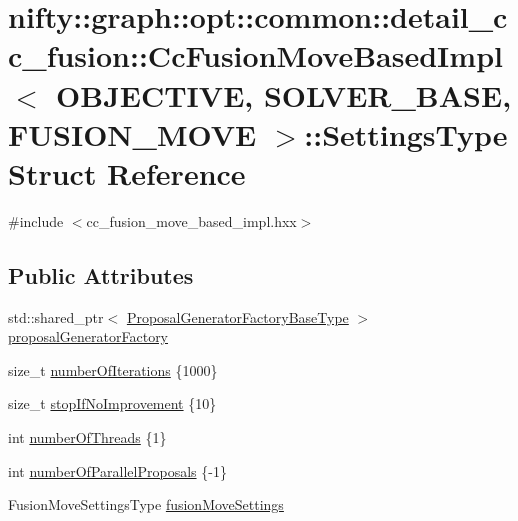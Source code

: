 \hypertarget{structnifty_1_1graph_1_1opt_1_1common_1_1detail__cc__fusion_1_1CcFusionMoveBasedImpl_1_1SettingsType}{}\section{nifty\+:\+:graph\+:\+:opt\+:\+:common\+:\+:detail\+\_\+cc\+\_\+fusion\+:\+:Cc\+Fusion\+Move\+Based\+Impl$<$ O\+B\+J\+E\+C\+T\+I\+VE, S\+O\+L\+V\+E\+R\+\_\+\+B\+A\+SE, F\+U\+S\+I\+O\+N\+\_\+\+M\+O\+VE $>$\+:\+:Settings\+Type Struct Reference}
\label{structnifty_1_1graph_1_1opt_1_1common_1_1detail__cc__fusion_1_1CcFusionMoveBasedImpl_1_1SettingsType}


{\ttfamily \#include $<$cc\+\_\+fusion\+\_\+move\+\_\+based\+\_\+impl.\+hxx$>$}

\subsection*{Public Attributes}
\begin{DoxyCompactItemize}
\item 
std\+::shared\+\_\+ptr$<$ \hyperlink{classnifty_1_1graph_1_1opt_1_1common_1_1detail__cc__fusion_1_1CcFusionMoveBasedImpl_a5b8c102a697bde14691f87816956af00}{Proposal\+Generator\+Factory\+Base\+Type} $>$ \hyperlink{structnifty_1_1graph_1_1opt_1_1common_1_1detail__cc__fusion_1_1CcFusionMoveBasedImpl_1_1SettingsType_a279c363e73398244cc65a1becb2f1896}{proposal\+Generator\+Factory}
\item 
size\+\_\+t \hyperlink{structnifty_1_1graph_1_1opt_1_1common_1_1detail__cc__fusion_1_1CcFusionMoveBasedImpl_1_1SettingsType_a95798899ad88d91dcaa5810c6a783962}{number\+Of\+Iterations} \{1000\}
\item 
size\+\_\+t \hyperlink{structnifty_1_1graph_1_1opt_1_1common_1_1detail__cc__fusion_1_1CcFusionMoveBasedImpl_1_1SettingsType_af0466c3e3f184877959cf3b83f19ed7d}{stop\+If\+No\+Improvement} \{10\}
\item 
int \hyperlink{structnifty_1_1graph_1_1opt_1_1common_1_1detail__cc__fusion_1_1CcFusionMoveBasedImpl_1_1SettingsType_a32caa02ed79c6b188aaba9a686e97e74}{number\+Of\+Threads} \{1\}
\item 
int \hyperlink{structnifty_1_1graph_1_1opt_1_1common_1_1detail__cc__fusion_1_1CcFusionMoveBasedImpl_1_1SettingsType_afc7aab82f9d40ecbf2c4f183c6fc5722}{number\+Of\+Parallel\+Proposals} \{-\/1\}
\item 
Fusion\+Move\+Settings\+Type \hyperlink{structnifty_1_1graph_1_1opt_1_1common_1_1detail__cc__fusion_1_1CcFusionMoveBasedImpl_1_1SettingsType_a974219c028df2a7e862529369c9f23fc}{fusion\+Move\+Settings}
\end{DoxyCompactItemize}


